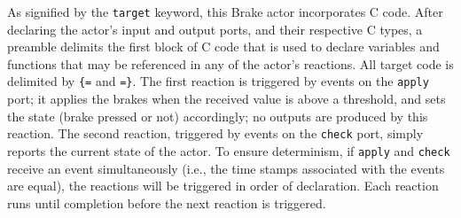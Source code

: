 \documentclass[sigconf]{acmart}
\newcommand{\todo}[1]{\mynote{TODO}{#1}{red}}
\newcommand{\marten}[1]{\mynote{Marten}{#1}{cyan}}%
\begin{document}
As signified by the {\tt target} keyword, this Brake actor incorporates C code. After declaring the actor's input and output ports, and their respective C types, a preamble delimits the first block of C code that is used to declare variables and functions that may be referenced in any of the actor's reactions. All target code is delimited by {\tt \{=} and {\tt =\}}. The first reaction is triggered by events on the {\tt apply} port; it applies the brakes when the received value is above a threshold, and sets the state (brake pressed or not) accordingly; no outputs are produced by this reaction. The second reaction, triggered by events on the {\tt check} port, simply reports the current state of the actor. To ensure determinism, if {\tt apply} and {\tt check} receive an event simultaneously (i.e., the time stamps associated with the events are equal), the reactions will be triggered in order of declaration. Each reaction runs until completion before the next reaction is triggered.









   
\end{document}

